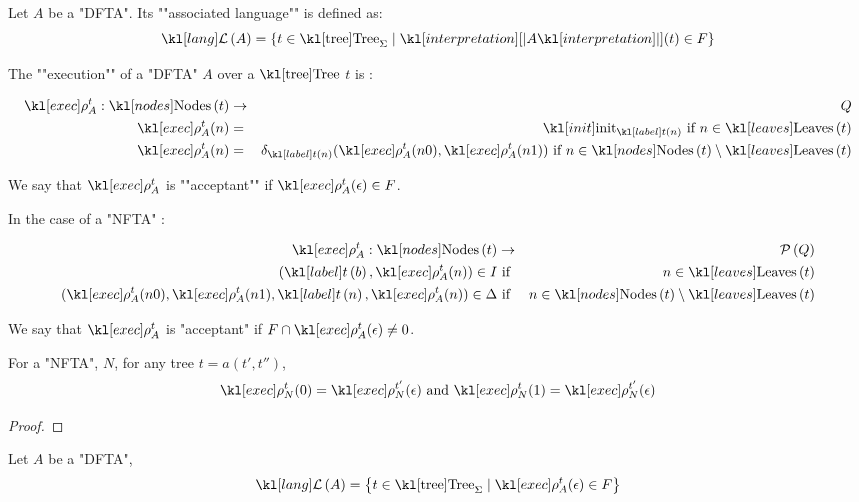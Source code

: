 \documentclass{article}
\begin{document}
\begin{definition}
	Let $A$ be a "DFTA". Its ""associated language"" is defined as:
	$$\lang A = \setdef {t \in \tree_{\Sigma}} {\interpret A (t) \in F}$$
\end{definition}


\begin{definition}
	The ""execution"" of a "DFTA" $A$ over a $\tree$ $t$ is :

	\begin{eqnarray*}
		\exec A t : \nodes t &\to & Q \\
		\exec A t (n)  &=& \init_{\tlabel t n} \text{ if } n \in \leaves t \\
		\exec A t (n)  &=& \delta_{\tlabel t n}(\exec A t (n0), \exec A t (n1)) \text{ if } n \in \nodes t \setminus \leaves t
	\end{eqnarray*}

	We say that $\exec A t$ is ""acceptant"" if $\exec A t (\epsilon) \in F$.

	In the case of a "NFTA" :

	\begin{eqnarray*}
		\exec A t : \nodes t &\to& \parts Q \\
		(\tlabel t b,  \exec A t (n)) \in I &\text{ if }& n \in \leaves t \\
		(\exec A t (n0), \exec A t (n1), \tlabel t n, \exec A t (n)) \in \Delta &\text{ if }& n \in \nodes t \setminus \leaves t
	\end{eqnarray*}

	We say that $\exec A t$ is "acceptant" if $F \cap \exec A t (\epsilon) \neq 0$.

\end{definition}

\begin{lemma}
	For a "NFTA", $N$, for any tree $t = a(t',t'')$,
	$$\exec N t (0) = \exec N {t'} (\epsilon) \text{ and } \exec N t (1) = \exec N {t'} (\epsilon)$$
\end{lemma}

\begin{proof}
	\todo{}
\end{proof}


\begin{remark}
	Let $A$ be a "DFTA",
	$$ \lang A = \setdef {t \in \tree_{\Sigma}} {\exec A t (\epsilon) \in F} $$
\end{remark}
\end{document}
